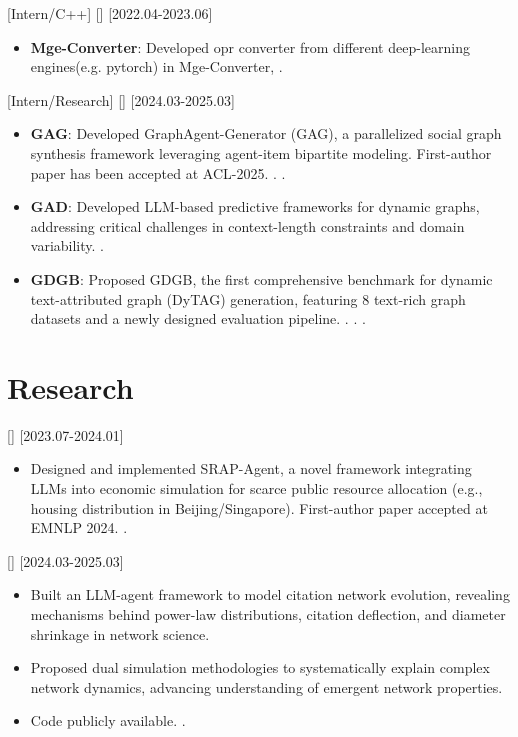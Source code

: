 \documentclass{resume}
\begin{document}
[Intern/C++]
[]
[2022.04-2023.06]
\begin{itemize}
  \item \textbf{Mge-Converter}: Developed opr converter from different deep-learning engines(e.g. pytorch) in Mge-Converter, .
\end{itemize}
[Intern/Research]
[]
[2024.03-2025.03]
\begin{itemize}
  \item \textbf{GAG}: Developed GraphAgent-Generator (GAG), a parallelized social graph synthesis framework leveraging agent-item bipartite modeling. First-author paper has been accepted at ACL-2025. . .
  \item \textbf{GAD}: Developed LLM-based predictive frameworks for dynamic graphs, addressing critical challenges in context-length constraints and domain variability. .
  \item \textbf{GDGB}: Proposed GDGB, the first comprehensive benchmark for dynamic text-attributed graph (DyTAG) generation, featuring 8 text-rich graph datasets and a newly designed evaluation pipeline. . . .
\end{itemize}



\section{Research}
[]
[2023.07-2024.01]
\begin{itemize}
  \item Designed and implemented SRAP-Agent, a novel framework integrating LLMs into economic simulation for scarce public resource allocation (e.g., housing distribution in Beijing/Singapore). First-author paper accepted at EMNLP 2024. . 
\end{itemize}

[]
[2024.03-2025.03]
\begin{itemize}
  \item Built an LLM-agent framework to model citation network evolution, revealing mechanisms behind power-law distributions, citation deflection, and diameter shrinkage in network science.
  \item Proposed dual simulation methodologies to systematically explain complex network dynamics, advancing understanding of emergent network properties.
  \item Code publicly available. .
\end{itemize}
\end{document}
